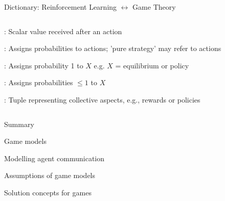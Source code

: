 \begin{frame}{Dictionary: Reinforcement Learning \(\leftrightarrow\) Game Theory}
\begin{columns}[T]
    \begin{column}{0.5\textwidth}
        \blist
            \item {}: Scalar value received after an action
            \item {}: Assigns probabilities to actions; 'pure strategy' may refer to actions
            \item {}: Assigns probability 1 to $X$ e.g. $X$ = equilibrium or policy
            \item {}: Assigns probabilities $\leq 1$ to $X$
            \item {}: Tuple representing collective aspects, e.g., rewards or policies
        \elist
    \end{column}
\end{columns}
\end{frame}

\begin{frame}{Summary}

    \blist
        \item Game models 
        \item Modelling agent communication
        \item Assumptions of game models
    \elist


    \blist
        \item Solution concepts for games
    \elist

    
\end{frame}




